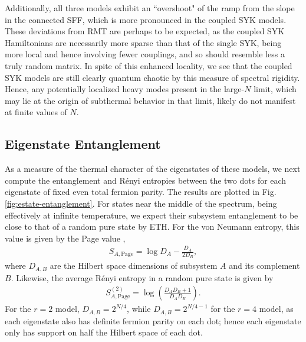 \documentclass[reprint, floatfix,eqsecnum,superscriptaddress,preprint,nofootinbib,onecolumn,amsmath,amssymb,aps,prb]{revtex4-2}
\begin{document}
Additionally, all three models exhibit an ``overshoot" of the ramp from the slope in the connected SFF, which is more pronounced in the coupled SYK models. 
These deviations from RMT are perhaps to be expected, as the coupled SYK Hamiltonians are necessarily more sparse than that of the single SYK, being more local and hence involving fewer couplings, and so should resemble less a truly random matrix. In spite of this enhanced locality, we see that the coupled SYK models are still clearly quantum chaotic by this measure of spectral rigidity. Hence, any potentially localized heavy modes present in the large-$N$ limit, which may lie at the origin of subthermal behavior in that limit, likely do not manifest at finite values of $N$.


\subsection{Eigenstate Entanglement}

As a measure of the thermal character of the eigenstates of these models, %
we next compute the entanglement and R\'enyi entropies between the two dots for each eigenstate of fixed even total fermion parity. The results are plotted in Fig. \ref{fig:estate-entanglement}. 
For states near the middle of the spectrum, being effectively at infinite temperature, we expect their subsystem entanglement to be close to that of a random pure state by ETH. For the von Neumann entropy, this value is given by the Page value \cite{Page1993},
\begin{align}
    S_{A,\text{Page}} = \log D_A - \frac{D_A}{2D_B}, \label{eqn:page-value}
\end{align}
where $D_{A,B}$ are the Hilbert space dimensions of subsystem $A$ and its complement $B$. Likewise, the average R\'enyi entropy in a random pure state is given by \cite{Lubkin1978}
\begin{align}
    S_{A,\text{Page}}^{(2)} = \log\left( \frac{D_A D_B + 1}{D_A D_B} \right). \label{eqn:page-value-renyi}
\end{align}
For the $r=2$ model, $D_{A,B} = 2^{N/4}$, while $D_{A,B} = 2^{N/4-1}$ for the $r=4$ model, as each eigenstate also has definite fermion parity on each dot; hence each eigenstate only has support on half the Hilbert space of each dot. 
\end{document}
